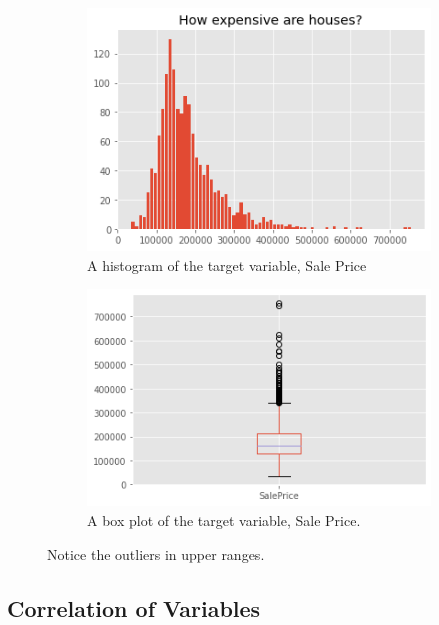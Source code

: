 \documentclass{article}
\begin{document}
\begin{figure}[h!]
	\centering
	\begin{subfigure}[b]{0.4\linewidth}
	  \includegraphics[width=\linewidth]{salehist}
	  \caption{A histogram of the target variable, Sale Price}
	\end{subfigure}
	\begin{subfigure}[b]{0.4\linewidth}
	  \includegraphics[width=\linewidth]{salebox}
	  \caption{A box plot of the target variable, Sale Price. }
	\end{subfigure}
	\caption{Notice the outliers in upper ranges.}
	\label{fig:saleprice}
  \end{figure}
  

  \subsection{Correlation of Variables}
	
\end{document}
